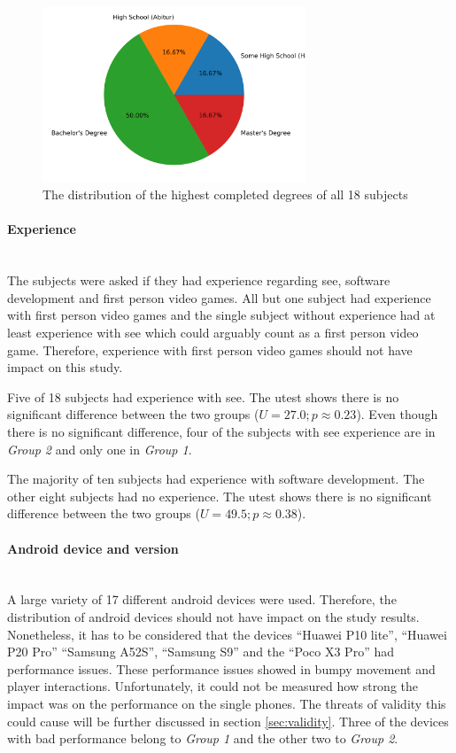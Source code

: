 \begin{figure}[H]
  \centering
  \includegraphics[width=0.7\textwidth]{Evaluation/img/degree.png}
  \caption{The distribution of the highest completed degrees of all 18 subjects}\label{fig:degree}
\end{figure}

\paragraph{Experience}\mbox{}\\
The subjects were asked if they had experience regarding \gls{see}, software development and first person video games.
All but one subject had experience with first person video games and the single subject without experience had at least experience with \gls{see} which could arguably count as a first person video game.
Therefore, experience with first person video games should not have impact on this study.

Five of 18 subjects had experience with \gls{see}.
The \gls{utest} shows there is no significant difference between the two groups ($U = 27.0; p \approx 0.23$).
Even though there is no significant difference, four of the subjects with \gls{see} experience are in \textit{Group 2} and only one in \textit{Group 1}.

The majority of ten subjects had experience with software development.
The other eight subjects had no experience.
The \gls{utest} shows there is no significant difference between the two groups ($U = 49.5; p \approx 0.38$).

\paragraph{Android device and version}\mbox{}\\
A large variety of 17 different \gls{android} devices were used.
Therefore, the distribution of \gls{android} devices should not have impact on the study results.
Nonetheless, it has to be considered that the devices \enquote{Huawei P10 lite}, \enquote{Huawei P20 Pro} \enquote{Samsung A52S}, \enquote{Samsung S9} and the \enquote{Poco X3 Pro} had performance issues.
These performance issues showed in bumpy movement and player interactions.
Unfortunately, it could not be measured how strong the impact was on the performance on the single phones.
The threats of validity this could cause will be further discussed in section \ref{sec:validity}.
Three of the devices with bad performance belong to \textit{Group 1} and the other two to \textit{Group 2}.

